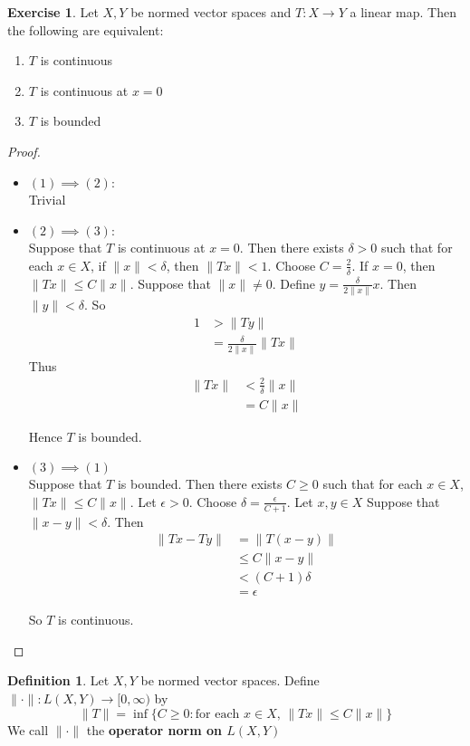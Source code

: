 \documentclass[12pt]{amsart}
\theoremstyle{definition}
\newtheorem{defn}[definition]{Definition}
\newtheorem{ex}[definition]{Exercise}
\newcommand{\del}{\delta}
\newcommand{\ep}{\epsilon}
\newcommand{\tbf}[1]{\textbf{#1}}
\newcommand{\Rg}{[0,\infty)}
\DeclareMathOperator*{\0}{\mbf{0}}
\DeclareMathOperator*{\1}{\mbf{1}}
\newcommand{\lex}[1]{\label{ex:#1}}
\newcommand{\ld}[1]{\label{defn:#1}}
\begin{document}
	\begin{ex} \lex{42004}
		Let $X,Y$ be normed vector spaces and $T:X \rightarrow Y$ a linear map. Then the following are equivalent:
		\begin{enumerate}
			\item $T$ is continuous
			\item $T$ is continuous at $x=0$
			\item $T$ is bounded
		\end{enumerate}
	\end{ex}
	
	\begin{proof}\
		\begin{itemize}
		\item $(1) \implies (2)$:\\
		Trivial
		\item $(2) \implies (3)$:\\
		Suppose that $T$ is continuous at $x=0$. Then there exists $\del>0$ such that for each $x \in X$, if $\|x \|< \del$, then $\|Tx \|< 1$. Choose $C = \frac{2}{\del}$. If $x=0$, then $\|Tx \|\leq C \|x \|$. Suppose that $\|x \|\neq 0$. Define $y = \frac{\del}{2 \|x \|}x$. Then $\|y \|< \del$. So 
		\begin{align*}
		1 
		&> \|Ty \|\\
		&= \frac{\del}{2 \|x \|} \|Tx \|
		\end{align*}
		Thus 
		\begin{align*}
			\|Tx \|
			&< \frac{2}{\del} \|x \| \\
			&=C \|x \|
		\end{align*}
		
		Hence $T$ is bounded.
		\item $(3) \implies (1)$\\
		Suppose that $T$ is bounded. Then there exists $C \geq 0$ such that for each $x \in X$, $\|Tx \|\leq C\|x \|$. Let $\ep >0$. Choose $\del = \frac{\ep}{C+1}$. Let $x,y \in X$ Suppose that $\|x-y \|< \del$. Then 
		\begin{align*}
			\|Tx-Ty \|
			& = \|T(x-y) \| \\
			& \leq C \|x-y \|\\
			&< (C+1) \del\\ 
			&= \ep
		\end{align*}
		
		So $T$ is continuous.
		\end{itemize}
	\end{proof}
	
	\begin{defn} \ld{42005}
		Let $X,Y$ be normed vector spaces. Define $\|\cdot\|: L(X,Y)\rightarrow \Rg$ by $$\|T\| = \inf \{C \geq 0: \text{for each }x \in X\text{, } \|Tx \|\leq C\|x\|\}$$ We call $\|\cdot \|$ the \tbf{operator norm on $L(X,Y)$}
	\end{defn}
	
\end{document}
